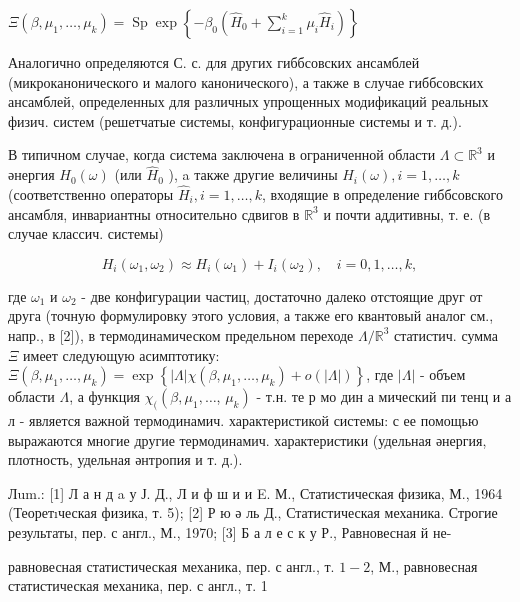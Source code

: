 \documentclass[10pt]{article}
\begin{document}
$\Xi\left(\beta, \mu_{1}, \ldots, \mu_{k}\right)=\operatorname{Sp} \exp \left\{-\beta_{0}\left(\hat{H}_{0}+\sum_{i=1}^{k} \mu_{i} \hat{H}_{i}\right)\right\}$



Аналогично определяются С. с. для других гиббсовских ансамблей (микроканонического и малого канонического), а также в случае гиббсовских ансамблей, определенных для различных упрощенных модификаций реальных физич. систем (решетчатые системы, конфигурационные системы и т. д.).



В типичном случае, когда система заключена в ограниченной области $\Lambda \subset \mathbb{R}^{3}$ и әнергия $H_{0}(\omega)$ (или $\hat{H}_{0}$ ), a также другие величины $H_{i}(\omega), i=1, \ldots, k$ (соответственно операторы $\hat{H}_{i}, i=1, \ldots, k$, входящие в определение гиббсовского ансамбля, инвариантны относительно сдвигов в $\mathbb{R}^{3}$ и почти аддитивны, т. е. (в случае классич. системы)



\[

H_{i}\left(\omega_{1}, \omega_{2}\right) \approx H_{i}\left(\omega_{1}\right)+I_{i}\left(\omega_{2}\right), \quad i=0,1, \ldots, k,

\]



где $\omega_{1}$ и $\omega_{2}$ - две конфигурации частиц, достаточно далеко отстоящие друг от друга (точную формулировку этого условия, а также его квантовый аналог см., напр., в [2]), в термодинамическом предельном переходе $\Lambda / \mathbb{R}^{3}$ статистич. сумма $\Xi$ имеет следующую асимптотику: $\Xi\left(\beta, \mu_{1}, \ldots, \mu_{k}\right)=\exp \left\{|\Lambda| \chi\left(\beta, \mu_{1}, \ldots, \mu_{k}\right)+o(|\Lambda|)\right\}$, где $|\Lambda|$ - объем области $\Lambda$, а функция $\chi_{(}\left(\beta, \mu_{1}, \ldots\right.$, $\left.\mu_{k}\right)$ - т.н. те р мо дин а мический пи тенц и а л - является важной термодинамич. характеристикой системы: с ее помощью выражаются многие другие термодинамич. характеристики (удельная әнергия, плотность, удельная әнтропия и т. д.).



Лum.: [1] Л а н д a у Ј. Д., Л и ф ш и и E. М., Статистическая физика, М., 1964 (Теоретıческая физика, т. 5); [2] Р ю ә ль Д., Статистическая механика. Строгие результаты, пер. с англ., М., 1970; [3] Б а л е с к у Р., Равновесная й не-

равновесная статистическая механика, пер. с англ., т. $1-2$, М., равновесная статистическая механика, пер. с англ., т. 1
\end{document}
